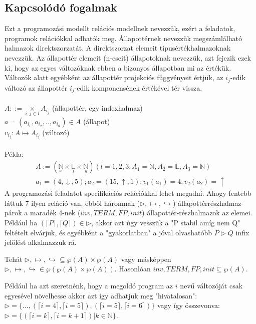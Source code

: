\documentclass{article}
\begin{document}
\subsection*{Kapcsolódó fogalmak}

Ezt a programozási modellt relációs modellnek nevezzük, ezért a feladatok, programok relációkkal adhatók meg. Állapottérnek nevezzük megszámlálható halmazok direktszorzatát. A direktszorzat elemeit típusértékhalmazoknak nevezzük. Az állapottér elemeit (n-eseit) állapotoknak nevezzük, azt fejezik ezek ki, hogy az egyes változóknak ebben a bizonyos állapotban mi az értékük. Változók alatt egyébként az állapottér projekciós függvényeit értjük, az $i_j$-edik változó az állapottér $i_j$-edik komponensének értékével tér vissza.
\\\\
$A::= \underset{{i,j \in I}}{\times} A_{i_j}$ (állapottér, egy indexhalmaz)\\
$a = (a_{i_1}, a_{i_2},..,a_{i_n}) \in A$ (állapot) \\
$v_{i_j} : A \mapsto A_{i_j}$ (változó)
\\\\
Példa:
\begin{align*}
A := (\underset{x}{\mathbb{N}} \times \underset{l}{\mathbb{L}} \times \underset{y}{\mathbb{N}}) (l = {1,2,3}; A_1 = \mathbb{N}, A_2 = \mathbb{L}, A_3 = \mathbb{N})\\
 a_1 = (4,\downarrow,5); a_2 = (15,\uparrow,1);v_1(a_1) = 4, v_2(a_2) = \uparrow
\end{align*}
A programozási feladatot specifikációs relációkkal lehet megadni. Ahogy fentebb láttuk 7 ilyen reláció van, ebből háromnak ($\triangleright, \mapsto, \hookrightarrow$) állapottérrészhalmaz-párok a maradék 4-nek ($inv, TERM, FP, init$) állapottér-részhalmazok az elemei. Például ha $(\lceil P \rceil,\lceil Q \rceil) \in \triangleright $, akkor azt úgy vesszük a "P stabil amíg nem Q" feltételt elvárjuk, és egyébként a "gyakorlatban" a jóval olvashatóbb $P \triangleright Q$ infix jelölést alkalmazzuk rá.

Tehát $\triangleright, \mapsto, \hookrightarrow \subseteq \wp(A) \times \wp(A)$ vagy másképpen $\triangleright, \mapsto, \hookrightarrow \in \wp(\wp(A) \times \wp(A))$. Hasonlóan $inv, TERM, FP, init \subseteq \wp(A)$.

Például ha azt szeretnénk, hogy a megoldó program az $i$ nevű változóját csak egyesével növelhesse akkor azt így adhatjuk meg "hivatalosan": $\triangleright = \lbrace...,(\lceil i=4 \rceil,\lceil i=5 \rceil),(\lceil i=5 \rceil,\lceil i=6 \rceil)\rbrace$ vagy így összevonva: $\triangleright = \lbrace(\lceil i=k \rceil,\lceil i=k+1 \rceil) | k \in \mathbb{N} \rbrace$.
\end{document}
